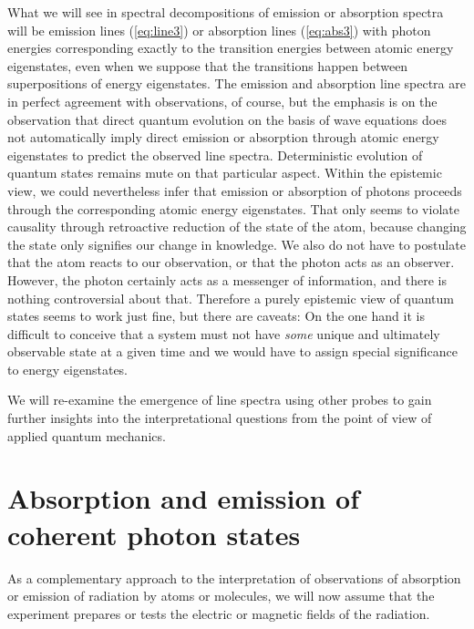 \documentclass[final,3p,12pt]{elsarticle3}
\begin{document}
What we will see in spectral decompositions of emission or absorption
spectra will be emission lines (\ref{eq:line3}) or absorption lines
(\ref{eq:abs3}) with photon energies corresponding exactly to the
transition energies between atomic energy eigenstates, even when we
suppose that the transitions happen between superpositions of energy 
eigenstates. The emission and absorption line spectra are in perfect 
agreement with observations, of course, but the emphasis is on the 
observation that direct quantum evolution on the basis of wave equations 
does not automatically imply direct emission or absorption through atomic 
energy eigenstates to predict the observed line spectra. Deterministic
evolution of quantum states remains mute on that particular aspect.
Within the epistemic view, we could nevertheless infer that emission
or absorption of photons proceeds through the corresponding atomic
energy eigenstates. That only seems to violate causality
through retroactive reduction of the state of the atom,
because changing the state only signifies our change in knowledge.
We also do not have to postulate that the atom reacts to our observation,
or that the photon acts as an observer. However, the photon certainly acts
as a messenger of information, and there is nothing controversial about 
that. Therefore a purely epistemic view of quantum states seems to work 
just fine, but there are caveats: On the one hand it is difficult to conceive 
that a system must not have {\it some} unique and ultimately observable
state at a given time and we would have to assign special 
significance to energy eigenstates.

We will re-examine the emergence of line spectra using other probes to gain
 further insights into the interpretational questions from the point of view 
of applied quantum mechanics.

\section{Absorption and emission of coherent photon states}
\label{sec:coherent}

As a complementary approach to the interpretation of observations of
absorption or emission of radiation by atoms or molecules, we will now
assume that the experiment prepares or tests the electric or magnetic fields 
of the radiation. 
\end{document}

